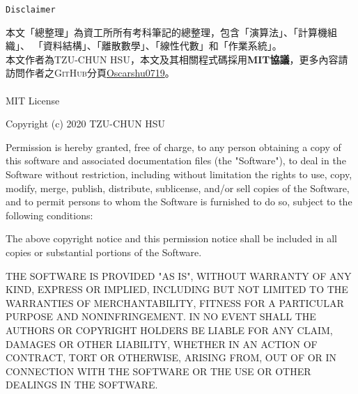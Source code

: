 \begin{center}
    \Huge{\texttt{Disclaimer}}\\
\end{center}

本文「總整理」為資工所所有考科筆記的總整理，包含「演算法」\cite{algo-1}\cite{algo-2}、「計算機組織」\cite{ca-1}\cite{ca-2}\cite{ca-3}、
「資料結構」\cite{ds-1}\cite{ds-2}、「離散數學」\cite{dm-1}\cite{dm-2}\cite{dm-3}\cite{dm-4}、「線性代數」\cite{la-1}\cite{la-2}\cite{la-3}\cite{la-4}和「作業系統」\cite{os-1}\cite{os-2}。 \\
本文作者為\textsc{TZU-CHUN HSU}，本文及其相關程式碼採用\textbf{MIT協議}，更多內容請訪問作者之\textsc{GitHub}分頁\href{https://github.com/Oscarshu0719}{Oscarshu0719}。 \\~\\

\con
MIT License

Copyright (c) 2020 TZU-CHUN HSU

Permission is hereby granted, free of charge, to any person obtaining a copy
of this software and associated documentation files (the "Software"), to deal
in the Software without restriction, including without limitation the rights
to use, copy, modify, merge, publish, distribute, sublicense, and/or sell
copies of the Software, and to permit persons to whom the Software is
furnished to do so, subject to the following conditions:

The above copyright notice and this permission notice shall be included in all
copies or substantial portions of the Software.

THE SOFTWARE IS PROVIDED "AS IS", WITHOUT WARRANTY OF ANY KIND, EXPRESS OR
IMPLIED, INCLUDING BUT NOT LIMITED TO THE WARRANTIES OF MERCHANTABILITY,
FITNESS FOR A PARTICULAR PURPOSE AND NONINFRINGEMENT. IN NO EVENT SHALL THE
AUTHORS OR COPYRIGHT HOLDERS BE LIABLE FOR ANY CLAIM, DAMAGES OR OTHER
LIABILITY, WHETHER IN AN ACTION OF CONTRACT, TORT OR OTHERWISE, ARISING FROM,
OUT OF OR IN CONNECTION WITH THE SOFTWARE OR THE USE OR OTHER DEALINGS IN THE
SOFTWARE.

\tnr
\pagebreak
